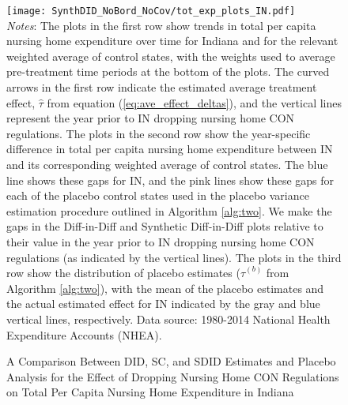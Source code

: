 \documentclass[../Main.tex]{subfiles}
\begin{document}
\newpage
{}
\begin{figure}[t] 
    \setlength{}
	\caption{\label{fig:tot_exp_plots_in} \centering A Comparison Between DID, SC, and SDID Estimates and Placebo Analysis for the Effect of Dropping Nursing Home CON Regulations on Total Per Capita Nursing Home Expenditure in Indiana} {\centering\texttt{[image: SynthDID\_NoBord\_NoCov/tot\_exp\_plots\_IN.pdf]}}
    \vspace{-1.4cm}\\
    \scriptsize
		\textit{Notes}: The plots in the first row show trends in total per capita nursing home expenditure over time for Indiana and for the relevant weighted average of control states, with the weights used to average pre-treatment time periods at the bottom of the plots. The curved arrows in the first row indicate the estimated average treatment effect, $\hat{\tau}$ from equation (\ref{eq:ave_effect_deltas}), and the vertical lines represent the year prior to IN dropping nursing home CON regulations. The plots in the second row show the year-specific difference in total per capita nursing home expenditure between IN and its corresponding weighted average of control states. The blue line shows these gaps for IN, and the pink lines show these gaps for each of the placebo control states used in the placebo variance estimation procedure outlined in Algorithm \ref{alg:two}. We make the gaps in the Diff-in-Diff and Synthetic Diff-in-Diff plots relative to their value in the year prior to IN dropping nursing home CON regulations (as indicated by the vertical lines). The plots in the third row show the distribution of placebo estimates ($\hat{\tau}^{(b)}$ from Algorithm \ref{alg:two}), with the mean of the placebo estimates and the actual estimated effect for IN indicated by the gray and blue vertical lines, respectively. Data source: 1980-2014 National Health Expenditure Accounts (NHEA).
\end{figure}
\restoregeometry
\clearpage
\end{document}
